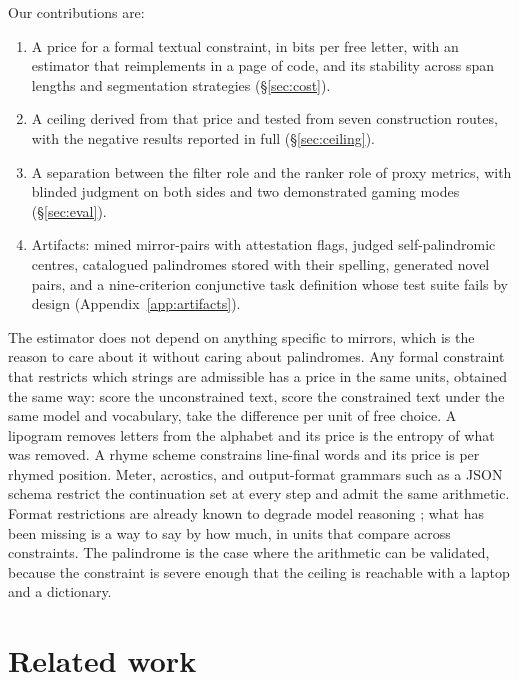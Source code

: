 \documentclass[11pt]{article}
\begin{document}
Our contributions are:

\begin{enumerate}
\itemsep0em
\item A price for a formal textual constraint, in bits per free letter, with an
estimator that reimplements in a page of code, and its stability across span
lengths and segmentation strategies (\S\ref{sec:cost}).
\item A ceiling derived from that price and tested from seven construction
routes, with the negative results reported in full (\S\ref{sec:ceiling}).
\item A separation between the filter role and the ranker role of proxy
metrics, with blinded judgment on both sides and two demonstrated gaming modes
(\S\ref{sec:eval}).
\item Artifacts: mined mirror-pairs with attestation flags, judged
self-palindromic centres, catalogued palindromes stored with their spelling,
generated novel pairs, and a nine-criterion conjunctive task definition whose
test suite fails by design (Appendix~\ref{app:artifacts}).
\end{enumerate}

The estimator does not depend on anything specific to mirrors, which is the
reason to care about it without caring about palindromes. Any formal constraint
that restricts which strings are admissible has a price in the same units,
obtained the same way: score the unconstrained text, score the constrained text
under the same model and vocabulary, take the difference per unit of free
choice. A lipogram removes letters from the alphabet and its price is the
entropy of what was removed. A rhyme scheme constrains line-final words and its
price is per rhymed position. Meter, acrostics, and output-format grammars such
as a JSON schema restrict the continuation set at every step and admit the same
arithmetic. Format restrictions are already known to degrade model reasoning
\citep{tam2024}; what has been missing is a way to say by how much, in units
that compare across constraints. The palindrome is the case where the
arithmetic can be validated, because the constraint is severe enough that the
ceiling is reachable with a laptop and a dictionary.

\section{Related work}
\end{document}
